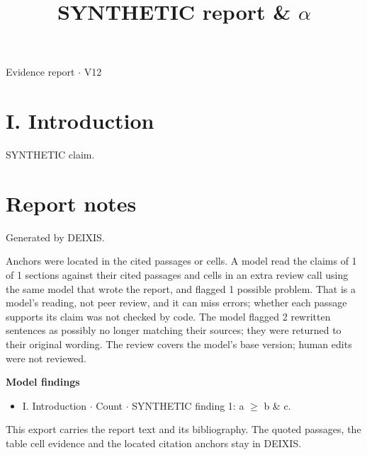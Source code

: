 \documentclass[journal]{IEEEtran}
\begin{document}
\title{SYNTHETIC report \& \ensuremath{\alpha}}

\maketitle

\noindent Evidence report \ensuremath{\cdot} V12

\section*{I. Introduction}

SYNTHETIC claim. \cite{Synth26}

\section*{Report notes}

Generated by DEIXIS.

Anchors were located in the cited passages or cells. A model read the claims of 1 of 1 sections against their cited passages and cells in an extra review call using the same model that wrote the report, and flagged 1 possible problem. That is a model’s reading, not peer review, and it can miss errors; whether each passage supports its claim was not checked by code. The model flagged 2 rewritten sentences as possibly no longer matching their sources; they were returned to their original wording. The review covers the model's base version; human edits were not reviewed.

\noindent\textbf{Model findings}

\begin{itemize}
\item I. Introduction \ensuremath{\cdot} Count \ensuremath{\cdot} SYNTHETIC finding 1: a \ensuremath{\geq} b \& c.
\end{itemize}

This export carries the report text and its bibliography. The quoted passages, the table cell evidence and the located citation anchors stay in DEIXIS.




\end{document}
